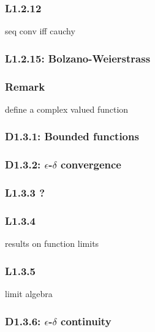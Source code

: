 \documentclass{article}
\begin{document}
\begin{multicols*}{3}
\subsubsection*{L1.2.12}
seq conv iff cauchy

\subsubsection*{L1.2.15: Bolzano-Weierstrass}

\subsubsection*{Remark}
define a complex valued function

\subsubsection*{D1.3.1: Bounded functions}

\subsubsection*{D1.3.2: $\epsilon$-$\delta$ convergence}

\subsubsection*{L1.3.3 ?}

\subsubsection*{L1.3.4}
results on function limits

\subsubsection*{L1.3.5}
limit algebra

\subsubsection*{D1.3.6: $\epsilon$-$\delta$ continuity}

\end{multicols*}
\end{document}
